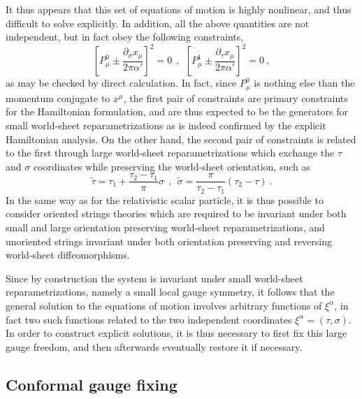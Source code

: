 \documentclass[a4paper,11pt]{article}
\begin{document}
It thus appears that this set of equations of motion is highly nonlinear,
and thus difficult to solve explicitly. In addition, all the above
quantities are not independent, but in fact obey the following constraints,
\begin{equation}
\left[P^0_\mu\pm\frac{\partial_\sigma x_\mu}{2\pi\alpha'}\right]^2=0\ \ ,\ \ 
\left[P^1_\mu\pm\frac{\partial_\tau x_\mu}{2\pi\alpha'}\right]^2=0\ ,
\end{equation}
as may be checked by direct calculation. In fact, since $P^0_\mu$ is
nothing else than the momentum conjugate to $x^\mu$, the first pair
of constraints are primary constraints for the Hamiltonian formulation,
and are thus expected to be the generators for small world-sheet
reparametrizations as is indeed confirmed by the explicit Hamiltonian
analysis. On the other hand, the second pair of constraints is related 
to the first through large world-sheet reparametrizations which exchange
the $\tau$ and $\sigma$ coordinates while preserving the world-sheet
orientation, such as
\begin{equation}
\tilde{\tau}=\tau_1+\frac{\tau_2-\tau_1}{\pi}\sigma\ \ ,\ \ 
\tilde{\sigma}=\frac{\pi}{\tau_2-\tau_1}(\tau_2-\tau)\ .
\end{equation}
In the same way as for the relativistic scalar particle, it is thus possible
to consider oriented strings theories which are required to be invariant
under both small and large orientation preserving 
world-sheet reparametrizations, and unoriented strings invariant under
both orientation preserving and reversing world-sheet diffeomorphisms.

Since by construction the system is invariant under small world-sheet
reparametrizations, namely a small local gauge symmetry, it follows that
the general solution to the equations of motion involves arbitrary
functions of $\xi^\alpha$, in fact two such functions related to the
two independent coordinates $\xi^\alpha=(\tau,\sigma)$. In order
to construct explicit solutions, it is thus necessary to first fix
this large gauge freedom, and then afterwards eventually restore it
if necessary.

\subsection{Conformal gauge fixing}
\label{Subsect7.2}
\end{document}
